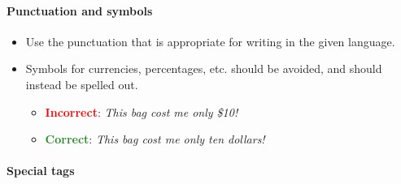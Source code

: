 \paragraph{Punctuation and symbols}
\begin{itemize}
    \item Use the punctuation that is appropriate for writing in the given language.
    \item Symbols for currencies, percentages, etc. should be avoided, and should instead be spelled out.
    \begin{itemize}
        \item  \textcolor{red}{\textbf{Incorrect}}: \textit{This bag cost me only \$10!}
        \item \textcolor{ForestGreen}{\textbf{Correct}}: \textit{This bag cost me only ten dollars!}
    \end{itemize}
\end{itemize}

\paragraph{Special tags}

